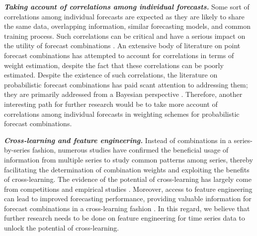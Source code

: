 \documentclass[a4paper,11pt]{article}
\begin{document}
\textbf{\textit{Taking account of correlations among individual forecasts.}} Some sort of correlations among individual forecasts are expected as they are likely to share the same data, overlapping information, similar forecasting models, and common training process. Such correlations can be critical and have a serious impact on the utility of forecast combinations \citep{De_Menezes2000-vd}. An extensive body of literature on point forecast combinations has attempted to account for correlations in terms of weight estimation, despite the fact that these correlations can be poorly estimated. Despite the existence of such correlations, the literature on probabilistic forecast combinations has paid scant attention to addressing them; they are primarily addressed from a Bayesian perspective \citep[e.g.,][]{Winkler1981-bn,McAlinn2019-kn}. Therefore, another interesting path for further research would be to take more account of correlations among individual forecasts in weighting schemes for probabilistic forecast combinations.

\textbf{\textit{Cross-learning and feature engineering.}} Instead of combinations in a series-by-series fashion, numerous studies have confirmed the beneficial usage of information from multiple series to study common patterns among series, thereby facilitating the determination of combination weights and exploiting the benefits of cross-learning. The evidence of the potential of cross-learning has largely come from competitions \citep[e.g.,][]{Makridakis2020-hu,Makridakis2020-fn} and empirical studies \citep[e.g.,][]{Ma2021-np}. Moreover, access to feature engineering can lead to improved forecasting performance, providing valuable information for forecast combinations in a cross-learning fashion \citep{Montero-Manso2020-tq,Kang2021-ol}. In this regard, we believe that further research needs to be done on feature engineering for time series data to unlock the potential of cross-learning.
\end{document}
